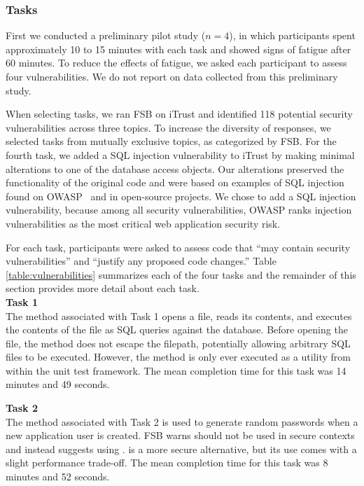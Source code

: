 \documentclass[10pt,journal,compsoc]{IEEEtran}
\begin{document}

  
\subsubsection{Tasks}
First we conducted a preliminary pilot study ($n = 4$), in which  participants spent approximately 10 to 15 minutes with each task and showed signs of fatigue after 60 minutes.
To reduce the effects of fatigue, we asked each participant to assess four vulnerabilities. 
We do not report on data collected from this preliminary study.

When selecting tasks, we ran FSB on iTrust and identified 118 potential security vulnerabilities across three topics.
To increase the diversity of responses, we selected tasks from mutually exclusive topics, as categorized by FSB.
For the fourth task, we added a SQL injection vulnerability to iTrust by making minimal alterations to one of the database access objects.
Our alterations preserved the functionality of the original code and were based on examples of SQL injection found on OWASP~\cite{OWASP} and in open-source projects.
We chose to add a SQL injection vulnerability, because among all security vulnerabilities, OWASP ranks injection vulnerabilities as the most critical web application security risk.

For each task, participants were asked to assess code that ``may contain security vulnerabilities'' and ``justify any proposed code changes.''
Table \ref{table:vulnerabilities} summarizes each of the four tasks and the remainder of this section provides more detail about each task.\\

\noindent\textbf{Task 1} \\
The method associated with Task 1 opens a file, reads its contents, and executes the contents of the file as SQL queries against the database. 
Before opening the file, the method does not escape the filepath, potentially allowing arbitrary SQL files to be executed.
However, the method is only ever executed as a utility from within the unit test framework. The mean completion time for this task was 14 minutes and 49 seconds.

\noindent\textbf{Task 2} \\
The method associated with Task 2 is used to generate random passwords when a new application user is created. FSB warns  should not be used in secure contexts and instead suggests using .  is a more secure alternative, but its use comes with a slight performance trade-off. 
The mean completion time for this task was 8 minutes and 52 seconds.
\end{document}
